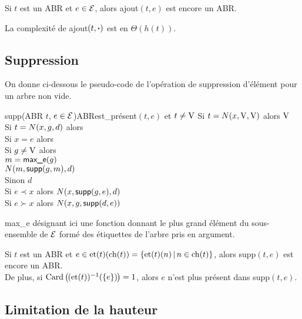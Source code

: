 		\begin{Propriete}
			Si \(t\) est un ABR et \(e\in\cal{E}\), alors \textsf{ajout}\((t,e)\) est encore un ABR.
		\end{Propriete}
	
		 La complexité de \textsf{ajout}\((t,\text{\bdot}\!\!)\) est en \(\Theta(h(t))\).
		
	\subsection{Suppression}
		
		On donne ci-dessous le pseudo-code de l'opération de suppression d'élément pour un arbre non vide.
		
		\begin{pscode}{supp}{(ABR \(t\), $e\in\cal{E}$)}{ABR}{\textsf{est\_présent}\((t,e)\) et $t\neq\V$}
			Si \(t=\N(x,\V,\V)\) alors \(\V\)  \\
			Si \(t = \N(x,g,d)\) alors \\ \Indp
				Si \(x=e\) alors \\ \Indp
					Si \(g\neq \V\) alors \\ \Indp
						\(m = \text{\textsf{max\_e}}(g)\) \\
						\(\N(m,\text{\textsf{supp}}(g,m),d)\) \\ \Indm
					Sinon \(d\) \\ \Indm \Indm
			Si \(e \prec x\) alors \(\N(x,\text{\textsf{supp}}(g,e),d)\) \\
			Si \(e \succ x\) alors \(\N(x,g,\text{\textsf{supp}}(d,e))\)
		\end{pscode}
	
		\textsf{max\_e} désignant ici une fonction donnant le plus grand élément du sous-ensemble de \(\cal{E}\) formé des étiquettes de l'arbre pris en argument.
	
		\begin{Propriete}
			Si \(t\) est un ABR et \(e \in \et(t)(\ch(t)) = \{\et(t)(n)\,|\,n\in\ch(t)\}\), alors \textsf{supp}\((t,e)\) est encore un ABR. \\
			De plus, si \(\card\big(\hs{-0.3}(\et(t))^{-1}(\{e\})\hs{-0.3}\big) = 1\), alors \(e\) n'est plus présent dans \textsf{supp}\((t,e)\).
		\end{Propriete}
		
	\subsection{Limitation de la hauteur}
		
